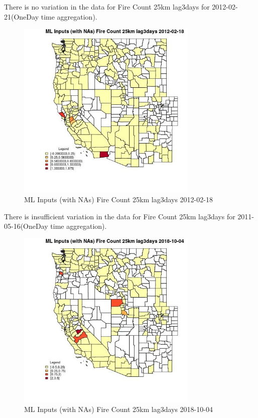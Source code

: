 There is no variation in the data for Fire Count 25km lag3days for 2012-02-21(OneDay time aggregation). 
 

\begin{figure} 
\centering  
\includegraphics[width=0.77\textwidth]{Code_Outputs/Report_ML_input_PM25_Step4_part_f_de_duplicated_aves_prioritize_24hr_obswNAs_CountyFire_Count_25km_lag3daysMean2012-02-18.jpg} 
\caption{\label{fig:Report_ML_input_PM25_Step4_part_f_de_duplicated_aves_prioritize_24hr_obswNAsCountyFire_Count_25km_lag3daysMean2012-02-18}ML Inputs (with NAs) Fire Count 25km lag3days 2012-02-18} 
\end{figure} 
 

There is insufficient variation in the data for Fire Count 25km lag3days for 2011-05-16(OneDay time aggregation). 
 

\begin{figure} 
\centering  
\includegraphics[width=0.77\textwidth]{Code_Outputs/Report_ML_input_PM25_Step4_part_f_de_duplicated_aves_prioritize_24hr_obswNAs_CountyFire_Count_25km_lag3daysMean2018-10-04.jpg} 
\caption{\label{fig:Report_ML_input_PM25_Step4_part_f_de_duplicated_aves_prioritize_24hr_obswNAsCountyFire_Count_25km_lag3daysMean2018-10-04}ML Inputs (with NAs) Fire Count 25km lag3days 2018-10-04} 
\end{figure} 
 

